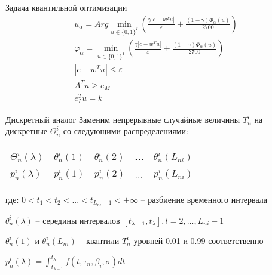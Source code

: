 \documentclass[aspectratio=169]{beamer}
\begin{document}
    \begin{frame}{Задача квантильной оптимизации}
        \begin{equation}
        \begin{gathered}
            u_\alpha = Arg\min_{u\in\{0, 1\}^I}\left(\frac{\gamma\left|c-w^T u\right|}{\varepsilon} + \frac{(1-\gamma)\Phi_\alpha(u)}{2700}\right)\\
            \varphi_\alpha = \min_{u\in\{0, 1\}^I}\left(\frac{\gamma\left|c-w^T u\right|}{\varepsilon} + \frac{(1-\gamma)\Phi_\alpha(u)}{2700}\right)\\
            |c-w^T u| \leq \varepsilon\\
            A^T u \geq e_M\\
            e_I^T u=k
        \end{gathered}
        \end{equation}
    \end{frame}
    
    \begin{frame}{Дискретный аналог}
        Заменим непрерывные случайные величины $T_n^i$ на дискретные $\Theta_n^i$ со следующими распределениями:\\
        
        \begin{table}[]
            \begin{tabular}{|l||l|l|l|l|}
                \hline
                $\Theta_n^i(\lambda)$ & $\theta_n^i(1)$ & $\theta_n^i(2)$ & ... & $\theta_n^i(L_{ni})$\\ \hline
                $p_n^i(\lambda)$ & $p_n^i(1)$ & $p_n^i(2)$ & ... & $p_n^i(L_{ni})$\\ \hline
            \end{tabular}
        \end{table}
        
        где:\newline
        $0 < t_1 < t_2 < ... < t_{L_{ni}-1} < +\infty$ -- разбиение временного интервала\newline
        
        $\theta_n^i(\lambda)$ -- середины интервалов $[t_{\lambda-1}, t_\lambda], l=2,...,L_{ni}-1$\newline
        
        $\theta_n^i(1)$ и $\theta_n^i(L_{ni})$ -- квантили $T_n^i$ уровней 0.01 и 0.99 соответственно\newline
        
        $p_n^i(\lambda)=\int_{t_{\lambda-1}}^{t_\lambda}f(t, \tau_n, \beta_i, \sigma)dt$
    \end{frame}
\end{document}
